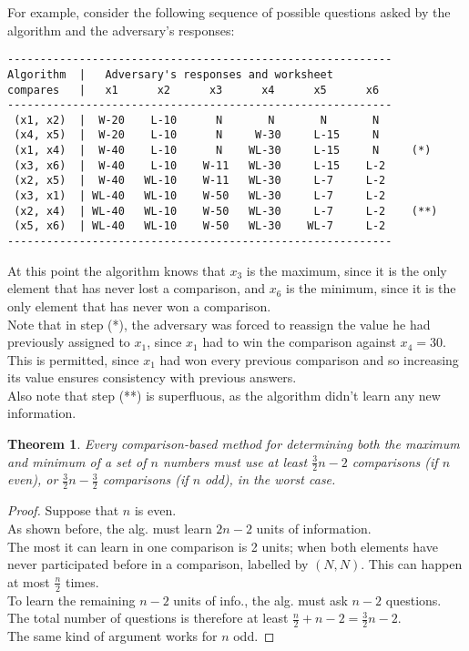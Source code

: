\documentclass[12pt]{article}
\theoremstyle{plain}
\newtheorem{theorem}{Theorem}[subsection]
\theoremstyle{definition}
\begin{document}
For example, consider the following sequence of possible questions asked by the algorithm and the adversary's responses:
\begin{verbatim}
-----------------------------------------------------------
Algorithm  |   Adversary's responses and worksheet
compares   |   x1      x2      x3      x4      x5      x6
-----------------------------------------------------------
 (x1, x2)  |  W-20    L-10      N       N       N       N
 (x4, x5)  |  W-20    L-10      N     W-30     L-15     N
 (x1, x4)  |  W-40    L-10      N    WL-30     L-15     N     (*)
 (x3, x6)  |  W-40    L-10    W-11   WL-30     L-15    L-2
 (x2, x5)  |  W-40   WL-10    W-11   WL-30     L-7     L-2
 (x3, x1)  | WL-40   WL-10    W-50   WL-30     L-7     L-2
 (x2, x4)  | WL-40   WL-10    W-50   WL-30     L-7     L-2    (**)
 (x5, x6)  | WL-40   WL-10    W-50   WL-30    WL-7     L-2
-----------------------------------------------------------
\end{verbatim}
At this point the algorithm knows that $x_3$ is the maximum, since it is the only element that has never lost a comparison, and $x_6$ is the minimum, since it is the only element that has never won a comparison. \\
Note that in step (*), the adversary was forced to reassign the value he had previously assigned to $x_1$, since $x_1$ had to win the comparison against $x_4 = 30$. \\
This is permitted, since $x_1$ had won every previous comparison and so increasing its value ensures consistency with previous answers. \\
Also note that step (**) is superfluous, as the algorithm didn't learn any new information.

\begin{theorem}
Every \emph{comparison-based} method for determining both the maximum and minimum of a set of $n$ numbers must use at least $\frac{3}{2}n - 2$ comparisons (if $n$ even), or $\frac{3}{2}n - \frac{3}{2}$ comparisons (if $n$ odd), in the worst case.
\end{theorem}
\begin{proof}
Suppose that $n$ is even. \\
As shown before, the alg. must learn $2n - 2$ units of information. \\
The most it can learn in one comparison is 2 units;
when both elements have never participated before in a comparison, labelled by $(N, N)$.
This can happen at most $\frac{n}{2}$ times. \\
To learn the remaining $n - 2$ units of info., the alg. must ask $n - 2$ questions. \\
The total number of questions is therefore at least $\frac{n}{2} + n - 2 = \frac{3}{2}n - 2$. \\
The same kind of argument works for $n$ odd.
\end{proof}
\end{document}
